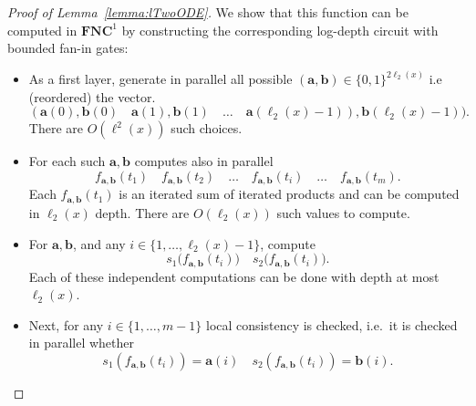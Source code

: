 \documentclass[11pt, oneside]{article}
\newcommand{\NC}{\mathbf{FNC}}
\newcommand{\tu}[1]{\mathbf{#1}}
\theoremstyle{definition}
\begin{document}
\begin{toappendix}
\begin{proof}[Proof of Lemma~\ref{lemma:lTwoODE}]
    We show that this function can be computed in $\NC^1$ by constructing the corresponding log-depth circuit with bounded fan-in gates:
    \begin{itemize}
        \itemsep0em
        \item As a first layer, generate in parallel all possible $(\tu a,\tu b)\in \{0,1\}^{2\ell_2(x)}$ i.e (reordered) the vector.
        $$
            (\tu a(0), \tu b(0) \quad \tu a(1), \tu b(1) \quad \dots \quad \tu a(\ell_2(x)-1)), \tu b(\ell_2(x)-1)).
        $$
        There are $O(\ell^2(x))$ such choices.
        \item For each such $\tu a, \tu b$ computes also in parallel 
        $$
            f_{\tu a, \tu b}(t_1) \quad f_{\tu a, \tu b}(t_2) \quad \dots \quad f_{\tu a, \tu b}(t_i) \quad \dots \quad f_{\tu a, \tu b}(t_m).
        $$
        Each  $f_{\tu a, \tu b}(t_1) $ is an iterated sum of iterated products and can be computed in $\ell_2(x)$ depth. There are $O(\ell_2(x))$ such values to compute. 
        \item For $\tu a, \tu b$, and any $i\in \{1,\dots, \ell_2(x)-1\}$, compute
        $$
        s_1(f_{\tu a, \tu b}(t_i)\big) \quad s_2\big(f_{\tu a, \tu b}(t_i)\big).
        $$
        Each of these independent computations can be done with depth at most $\ell_2(x)$.
        \item Next, for any $i\in \{1,\dots, m-1\}$ local consistency is checked, i.e.~it is checked in parallel whether
        $$
        s_1(f_{\tu a, \tu b}(t_i)) = \tu a(i) \quad s_2(f_{\tu a, \tu b}(t_i)) = \tu b(i).
        $$

\end{itemize}
\end{proof}
\end{toappendix}
\end{document}
